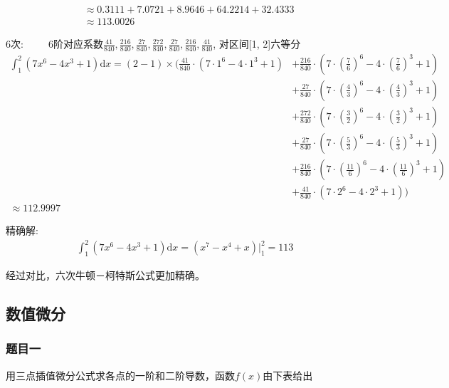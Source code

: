 \documentclass[UTF8]{ctexart}
\begin{document}
\begin{equation}\nonumber
    \begin{split}
        \\& \approx 0.3111+7.0721+8.9646+64.2214+32.4333
        \\& \approx 113.0026
    \end{split}
\end{equation}

6次:~~~~~6阶对应系数$\frac{41}{840}, \frac{216}{840}, \frac{27}{840}, 
\frac{272}{840}, \frac{27}{840}, \frac{216}{840}, \frac{41}{840}$, 
对区间[1, 2]六等分
\begin{equation}\nonumber
    \begin{split}
        \int_{1}^{2}\left(7 x^{6}-4 x^{3}+1\right) \mathrm{d} x = (2 - 1) \times (\frac{41}{840}\cdot(7\cdot{1}^6-4\cdot{1}^3+1) & +\frac{216}{840}\cdot(7\cdot{(\frac{7}{6})}^6-4\cdot{(\frac{7}{6})}^3+1)
        \\&+\frac{27}{840}\cdot(7\cdot{(\frac{4}{3})}^6-4\cdot{(\frac{4}{3})}^3+1)
        \\&+\frac{272}{840}\cdot(7\cdot{(\frac{3}{2})}^6-4\cdot{(\frac{3}{2})}^3+1)
        \\&+\frac{27}{840}\cdot(7\cdot{(\frac{5}{3})}^6-4\cdot{(\frac{5}{3})}^3+1)
        \\&+\frac{216}{840}\cdot(7\cdot{(\frac{11}{6})}^6-4\cdot{(\frac{11}{6})}^3+1)
        \\&+\frac{41}{840}\cdot(7\cdot{2}^6-4\cdot{2}^3+1))
        \\ \approx 112.9997
    \end{split}
\end{equation}

精确解:
\begin{equation}\nonumber
    \begin{split}
        \int_{1}^{2}\left(7 x^{6}-4 x^{3}+1\right) \mathrm{d} x = (x^7-x^4+x){|}^{2}_{1} = 113
    \end{split}
\end{equation}

经过对比，六次牛顿－柯特斯公式更加精确。
\subsection{数值微分}
\subsubsection{题目一}
用三点插值微分公式求各点的一阶和二阶导数，函数$f(x)$由下表给出
\end{document}
